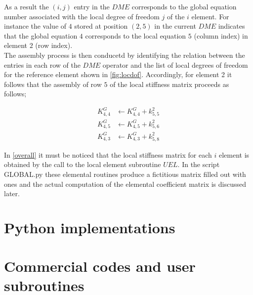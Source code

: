 As a result the $(i,j)$ entry in the $DME$ corresponds to the global equation number associated with the local degree of freedom $j$ of the $i$ element. For instance the value of $4$ stored at position $(2,5)$ in the current $DME$ indicates that the global equation $4$ corresponds to the local equation $5$ (column index) in element $2$ (row index).\\

The assembly process is then conducetd by identifying the relation between the entries in each row of the $DME$ operator and the list of local degrees of freedom for the reference element shown in \cref{fig:locdof}. Accordingly, for element 2 it follows that the assembly of row $5$ of the local stiffness matrix proceeds as follows;

\begin{align*}
K_{4,4}^G & \leftarrow  K_{4,4}^G + k_{5,5}^2 \\
K_{4,5}^G & \leftarrow  K_{4,5}^G + k_{5,6}^2 \\
K_{4,3}^G & \leftarrow  K_{4,3}^G + k_{5,8}^2
\end{align*}

In \cref{overall} it must be noticed that the local stiffness matrix for each $i$ element is obtained by the call to the local element subroutine $UEL$. In the script GLOBAL.py these elemental routines produce a fictitious matrix filled out with ones and the actual computation of the elemental coefficient matrix is discussed later.
\section{Python implementations}
\section{Commercial codes and user subroutines}





